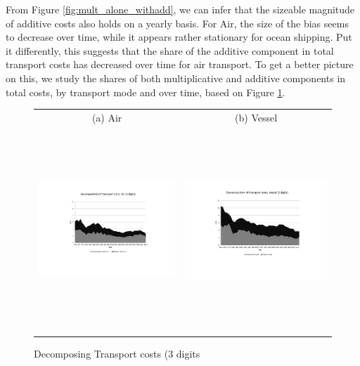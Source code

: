 \documentclass[a4paper,11pt]{article}
\begin{document}
From Figure \ref{fig:mult_alone_withadd}, we can infer that the sizeable magnitude of additive costs also holds on a yearly basis. For Air, the size of the bias seems to decrease over time, while it appears rather stationary for ocean shipping. Put it differently, this suggests that the share of the additive component in total transport costs has decreased over time for air transport. To get a better picture on this, we study the shares of both multiplicative and additive components in total costs, by transport mode and over time, based on Figure \ref{fig:decomp_TC_3d}. 

\begin{figure}[htbp]
\caption{Decomposing Transport costs (3 digits}\label{fig:decomp_TC_3d}
\begin{center}
\begin{tabular}{cc}
{\small (a) Air } & {\small (b) Vessel}\\
\includegraphics[width=3.5in, height=3in]{Fig2a_decompTC_air_3d.pdf}
& \includegraphics[width=3.5in,height=3in]{Fig2b_decompTC_vessel_3d.pdf} \\
\end{tabular}
\end{center}
\end{figure}
\end{document}
